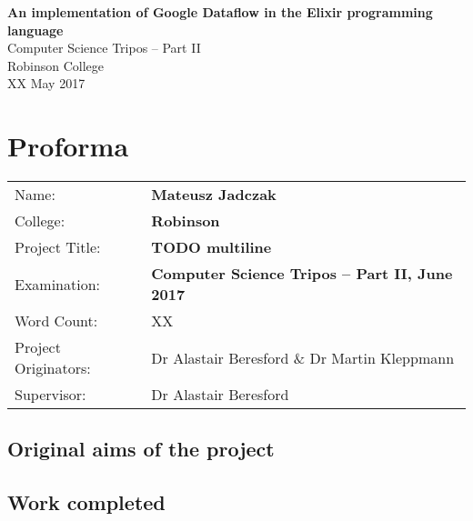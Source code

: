 
\begin{titlepage}

\vspace*{60mm}
\begin{center}
\Huge
\textbf{An implementation of Google Dataflow in the Elixir programming language} \\[5mm]
Computer Science Tripos -- Part II \\[5mm]
Robinson College \\[5mm]
XX May 2017 \\[20mm]
\end{center}
\end{titlepage}



{\let\cleardoublepage\clearpage \chapter*{Proforma}} %

{\large
\begin{tabu}{ll}
Name:               & \textbf {Mateusz Jadczak}                       \\
College:            & \textbf {Robinson}                     \\
Project Title:      & \textbf{TODO multiline} \\
Examination:        & \textbf {Computer Science Tripos -- Part II, June 2017}  \\
Word Count:         & XX\footnotemark[1]  \\
Project Originators: & Dr Alastair Beresford \& Dr Martin Kleppmann     \\
Supervisor:         &   Dr Alastair Beresford           \\ 
\end{tabu}
}

\bigskip

\section*{Original aims of the project}



\section*{Work completed}

